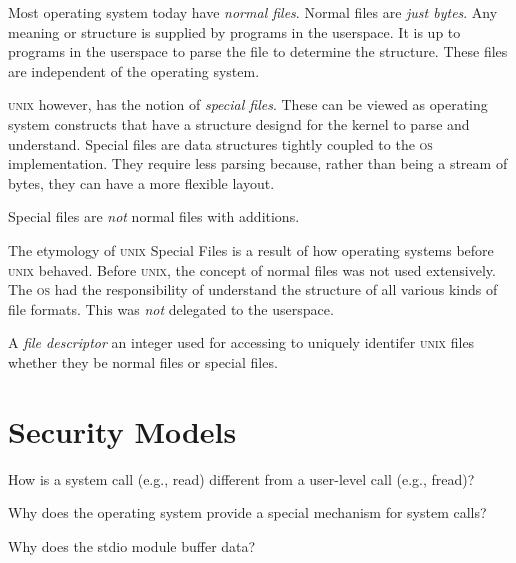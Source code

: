 Most operating system today have \textit{normal files}.
Normal files are \textit{just bytes}. Any meaning or structure 
is supplied by programs in the userspace. 
It is up to programs in the userspace to parse the file 
to determine the structure.
These files are independent of the operating system.

\textsc{unix} however, has the notion of \textit{special files}.
These can be viewed as operating system constructs that 
have a structure designd for the kernel to parse and understand. 
Special files are data structures tightly coupled to 
the \textsc{os} implementation. They require less parsing 
because, rather than being a stream of bytes, they can have a more 
flexible layout. 

Special files are \textit{not} normal files with additions.

The etymology of \textsc{unix} Special Files is a result of how 
operating systems before \textsc{unix} behaved. Before \textsc{unix}, 
the concept of normal files was not used extensively. 
The \textsc{os} had the responsibility of understand the structure 
of all various kinds of file formats. This was \textit{not} delegated 
to the userspace. 

\frmrule

A \textit{file descriptor} an integer used for accessing to uniquely 
identifer \textsc{unix} files whether they be normal files or special files.


\section{Security Models}

\begin{example}
How is a system call (e.g., read) different from a user-level call (e.g., fread)?
\end{example}

\begin{example}
Why does the operating system provide a special mechanism for system calls?
\end{example}

\begin{example}
Why does the stdio module buffer data? 
\end{example}


